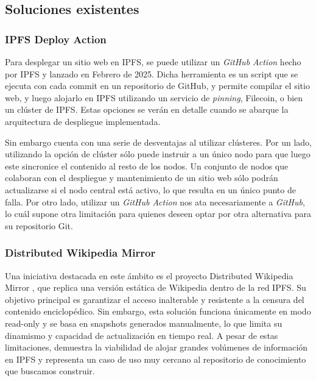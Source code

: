 \subsection{Soluciones existentes}

\subsubsection{IPFS Deploy Action}
Para desplegar un sitio web en IPFS, se puede utilizar un \textit{GitHub Action} hecho por IPFS y lanzado en Febrero de 2025. Dicha herramienta es un script que se ejecuta con cada commit en un repositorio de GitHub, y permite compilar el sitio web, y luego alojarlo en IPFS utilizando un servicio de \textit{pinning}, Filecoin, o bien un clúster de IPFS. Estas opciones se verán en detalle cuando se abarque la arquitectura de despliegue implementada.

Sin embargo cuenta con una serie de desventajas al utilizar clústeres. Por un lado, utilizando la opción de clúster sólo puede instruir a un único nodo para que luego este sincronice el contenido al resto de los nodos. Un conjunto de nodos que colaboran con el despliegue y mantenimiento de un sitio web sólo podrán actualizarse si el nodo central está activo, lo que resulta en un único punto de falla. Por otro lado, utilizar un \textit{GitHub Action} nos ata necesariamente a \textit{GitHub}, lo cuál supone otra limitación para quienes deseen optar por otra alternativa para su repositorio Git.

\subsubsection{Distributed Wikipedia Mirror}

Una iniciativa destacada en este ámbito es el proyecto Distributed Wikipedia Mirror \cite{distributed-wikipedia-mirror}, que replica una versión estática de Wikipedia dentro de la red IPFS. Su objetivo principal es garantizar el acceso inalterable y resistente a la censura del contenido enciclopédico. Sin embargo, esta solución funciona únicamente en modo read-only y se basa en snapshots generados manualmente, lo que limita su dinamismo y capacidad de actualización en tiempo real. A pesar de estas limitaciones, demuestra la viabilidad de alojar grandes volúmenes de información en IPFS y representa un caso de uso muy cercano al repositorio de conocimiento que buscamos construir.